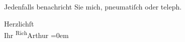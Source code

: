 \pstart
           Jedenfalls benachricht Sie mich, pneumatiſch oder teleph.\pend
           
\pstart
           Herzlichſt{\\[\baselineskip]}Ihr \spacefill\mbox{\substVorne{}\textsuperscript{Rich}\substDazwischen{}Arthur\substHinten{}}\pend
           \leftskip=0em{}\endnumbering{}  \newcommand{\dateiname}{L00642}\newcommand{\titel}{Arthur Schnitzler an Richard Beer-Hofmann, [zwischen 21. 1. und 3. 12. 1897?]}\newcommand{\editorInnen}{Martin Anton Müller und Gerd-Hermann Susen}
